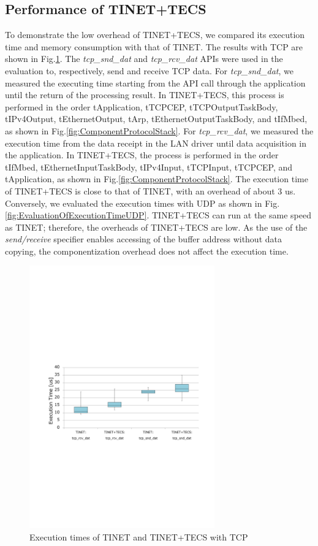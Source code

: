 \documentclass[JIP]{ipsj_v2/UTF8/ipsj}
\begin{document}
\subsection{Performance of TINET+TECS}

To demonstrate the low overhead of TINET+TECS, we compared its execution time and memory consumption with that of TINET.
The results with TCP are shown in Fig.\ref{fig:EvaluationOfExecutionTime}.
The {\it tcp\_snd\_dat} and {\it tcp\_rcv\_dat} APIs were used in the evaluation to, respectively, send and receive TCP data.
For {\it tcp\_snd\_dat}, we measured the executing time starting from the API call through the application until the return of the processing result.
In TINET+TECS, this process is performed in the order tApplication, tTCPCEP, tTCPOutputTaskBody, tIPv4Output, tEthernetOutput, tArp, tEthernetOutputTaskBody, and tIfMbed, as shown in Fig.\ref{fig:ComponentProtocolStack}.
For {\it tcp\_rcv\_dat}, we measured the execution time from the data receipt in the LAN driver until data acquisition in the application.
In TINET+TECS, the process is performed in the order tIfMbed, tEthernetInputTaskBody, tIPv4Input, tTCPInput, tTCPCEP, and tApplication, as shown in Fig.\ref{fig:ComponentProtocolStack}.
The execution time of TINET+TECS is close to that of TINET, with an overhead of about 3 us.
Conversely, we evaluated the execution times with UDP as shown in Fig.\ref{fig:EvaluationOfExecutionTimeUDP}.
TINET+TECS can run at the same speed as TINET; therefore, the overheads of TINET+TECS are low.
As the use of the {\it send/receive} specifier enables accessing of the buffer address without data copying, the componentization overhead does not affect the execution time.

\begin{figure}[t]
    \centering
    \includegraphics[width=8cm,clip]{figure/EvaluationOfExecutionTime.pdf}
    \caption{Execution times of TINET and TINET+TECS with TCP}
    \label{fig:EvaluationOfExecutionTime}
\end{figure}
\end{document}
